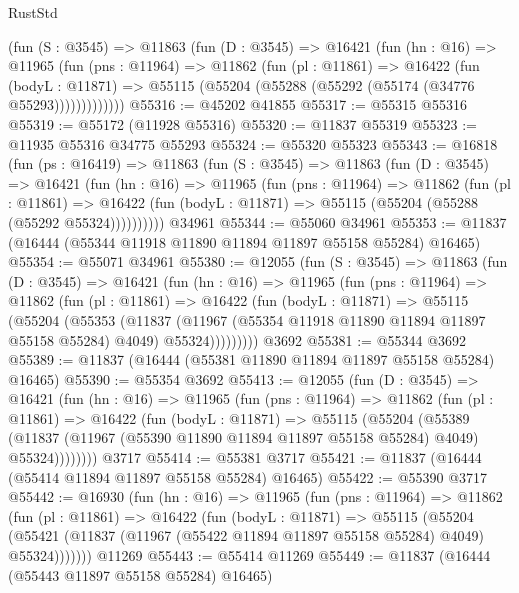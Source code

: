 \begin{lexlean}{RustStd}
\begin{coremodule}
{\begin{coremodule}
{{{{{{{{{{{{{{{{{{{{{{{{{{{{{{{{{{{{{{{{{{{{{{{{{{        (fun (S : @3545) =>
        @11863
          (fun (D : @3545) =>
          @16421
            (fun (hn : @16) =>
            @11965
              (fun (pns : @11964) =>
              @11862
                (fun (pl : @11861) =>
                @16422
                  (fun (bodyL : @11871) =>
                  @55115 (@55204 (@55288 (@55292 (@55174 (@34776 @55293)))))))))))))
@55316 := @45202 @41855
@55317 := @55315 @55316
@55319 := @55172 (@11928 @55316)
@55320 := @11837 @55319
@55323 := @11935 @55316 @34775 @55293
@55324 := @55320 @55323
@55343 := @16818
    (fun (ps : @16419) =>
    @11863
      (fun (S : @3545) =>
      @11863
        (fun (D : @3545) =>
        @16421
          (fun (hn : @16) =>
          @11965
            (fun (pns : @11964) =>
            @11862
              (fun (pl : @11861) =>
              @16422 (fun (bodyL : @11871) => @55115 (@55204 (@55288 (@55292 @55324))))))))))
    @34961
@55344 := @55060 @34961
@55353 := @11837 (@16444 (@55344 @11918 @11890 @11894 @11897 @55158 @55284) @16465)
@55354 := @55071 @34961
@55380 := @12055
    (fun (S : @3545) =>
    @11863
      (fun (D : @3545) =>
      @16421
        (fun (hn : @16) =>
        @11965
          (fun (pns : @11964) =>
          @11862
            (fun (pl : @11861) =>
            @16422
              (fun (bodyL : @11871) =>
              @55115
                (@55204
                  (@55353
                    (@11837
                      (@11967 (@55354 @11918 @11890 @11894 @11897 @55158 @55284) @4049)
                      @55324)))))))))
    @3692
@55381 := @55344 @3692
@55389 := @11837 (@16444 (@55381 @11890 @11894 @11897 @55158 @55284) @16465)
@55390 := @55354 @3692
@55413 := @12055
    (fun (D : @3545) =>
    @16421
      (fun (hn : @16) =>
      @11965
        (fun (pns : @11964) =>
        @11862
          (fun (pl : @11861) =>
          @16422
            (fun (bodyL : @11871) =>
            @55115
              (@55204
                (@55389
                  (@11837 (@11967 (@55390 @11890 @11894 @11897 @55158 @55284) @4049) @55324))))))))
    @3717
@55414 := @55381 @3717
@55421 := @11837 (@16444 (@55414 @11894 @11897 @55158 @55284) @16465)
@55422 := @55390 @3717
@55442 := @16930
    (fun (hn : @16) =>
    @11965
      (fun (pns : @11964) =>
      @11862
        (fun (pl : @11861) =>
        @16422
          (fun (bodyL : @11871) =>
          @55115
            (@55204
              (@55421 (@11837 (@11967 (@55422 @11894 @11897 @55158 @55284) @4049) @55324)))))))
    @11269
@55443 := @55414 @11269
@55449 := @11837 (@16444 (@55443 @11897 @55158 @55284) @16465)
}}}}}}}}}}}}}}}}}}}}}}}}}}}}}}}}}}}}}}}}}}}}}}}}}}
\end{coremodule}}
\end{coremodule}
\end{lexlean}
